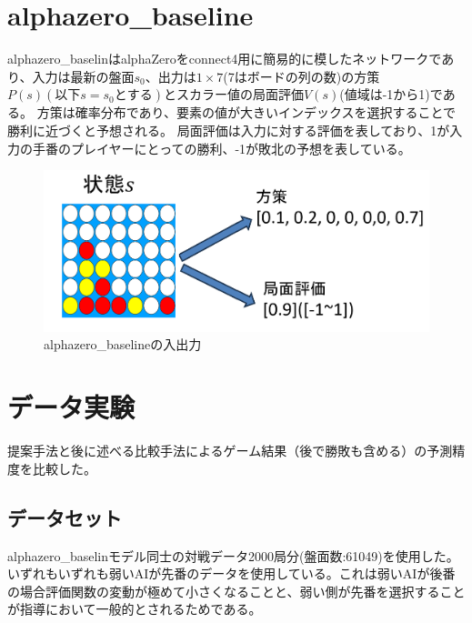 \section{alphazero\_baseline\cite{baseline}}
alphazero\_baselinはalphaZeroをconnect4用に簡易的に模したネットワークであり、入力は最新の盤面$s_0$、出力は$1\times7$(7はボードの列の数)の方策$P(s)(以下s=s_0とする)$とスカラー値の局面評価$V(s)$(値域は-1から1)である。
方策は確率分布であり、要素の値が大きいインデックスを選択することで勝利に近づくと予想される。
局面評価は入力に対する評価を表しており、1が入力の手番のプレイヤーにとっての勝利、-1が敗北の予想を表している。
\begin{figure}[t]
	\centering
	\includegraphics[width=\linewidth]{./figure/baseline.png}
	\caption{alphazero\_baselineの入出力}
	\label{fig:baseline}
\end{figure}

\section{データ実験}
\label{chap:evaluation}
提案手法と後に述べる比較手法によるゲーム結果（後で勝敗も含める）の予測精度を比較した。
\subsection{データセット}
alphazero\_baselinモデル同士の対戦データ2000局分(盤面数:61049)を使用した。いずれもいずれも弱いAIが先番のデータを使用している。これは弱いAIが後番の場合評価関数の変動が極めて小さくなることと、弱い側が先番を選択することが指導において一般的とされるためである。

